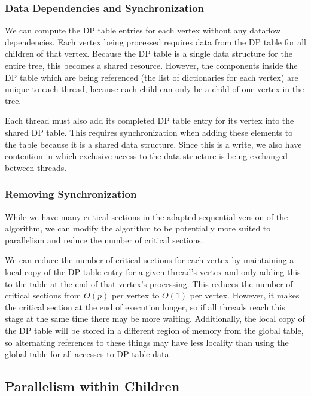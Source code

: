 \documentclass[11pt]{article}
\begin{document}
\subsubsection{Data Dependencies and Synchronization}

We can compute the DP table entries for each vertex without any dataflow dependencies.
Each vertex being processed requires data from the DP table for all children of that vertex.
Because the DP table is a single data structure for the entire tree, this becomes a shared resource.
However, the components inside the DP table which are being referenced (the list of dictionaries for each vertex) are unique to each thread, because each child can only be a child of one vertex in the tree.

Each thread must also add its completed DP table entry for its vertex into the shared DP table.
This requires synchronization when adding these elements to the table because it is a shared data structure.
Since this is a write, we also have contention in which exclusive access to the data structure is being exchanged between threads.

\subsubsection{Removing Synchronization}
\label{sec:levels:local}

While we have many critical sections in the adapted sequential version of the algorithm, we can modify the algorithm to be potentially more suited to parallelism and reduce the number of critical sections.

We can reduce the number of critical sections for each vertex by maintaining a local copy of the DP table entry for a given thread's vertex and only adding this to the table at the end of that vertex's processing.
This reduces the number of critical sections from $O(p)$ per vertex to $O(1)$ per vertex.
However, it makes the critical section at the end of execution longer, so if all threads reach this stage at the same time there may be more waiting.
Additionally, the local copy of the DP table will be stored in a different region of memory from the global table, so alternating references to these things may have less locality than using the global table for all accesses to DP table data.

\subsection{Parallelism within Children}
\label{sec:children}
\end{document}
